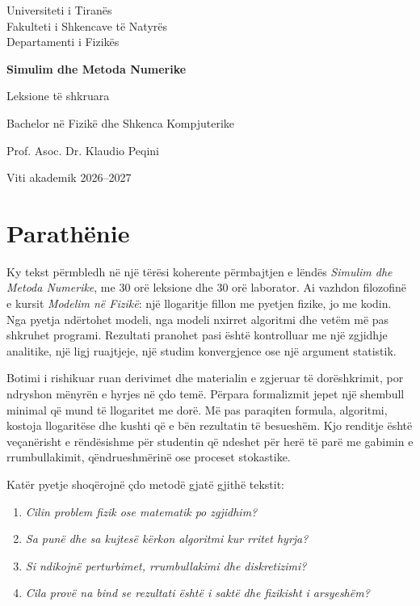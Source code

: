 \documentclass[11pt,oneside,openany]{book}
\begin{document}
\frontmatter
\begin{titlepage}
\centering
\vspace*{1.5cm}
{\Large Universiteti i Tiranës\\Fakulteti i Shkencave të Natyrës\\Departamenti i Fizikës\par}
\vspace{2.2cm}
{\Huge\bfseries Simulim dhe Metoda Numerike\par}
\vspace{.6cm}
{\LARGE Leksione të shkruara\par}
\vspace{1.4cm}
{\Large Bachelor në Fizikë dhe Shkenca Kompjuterike\par}
\vfill
{\large Prof. Asoc. Dr. Klaudio Peqini\par}
\vspace{.4cm}
{\large Viti akademik 2026--2027\par}
\end{titlepage}

\chapter*{Parathënie}
Ky tekst përmbledh në një tërësi koherente përmbajtjen e lëndës
\emph{Simulim dhe Metoda Numerike}, me 30 orë leksione dhe 30 orë laborator.
Ai vazhdon filozofinë e kursit \emph{Modelim në Fizikë}: një llogaritje
fillon me pyetjen fizike, jo me kodin. Nga pyetja ndërtohet modeli, nga modeli
nxirret algoritmi dhe vetëm më pas shkruhet programi. Rezultati pranohet pasi
është kontrolluar me një zgjidhje analitike, një ligj ruajtjeje, një studim
konvergjence ose një argument statistik.

Botimi i rishikuar ruan derivimet dhe materialin e zgjeruar të dorëshkrimit,
por ndryshon mënyrën e hyrjes në çdo temë. Përpara formalizmit jepet një
shembull minimal që mund të llogaritet me dorë. Më pas paraqiten formula,
algoritmi, kostoja llogaritëse dhe kushti që e bën rezultatin të besueshëm.
Kjo renditje është veçanërisht e rëndësishme për studentin që ndeshet për herë
të parë me gabimin e rrumbullakimit, qëndrueshmërinë ose proceset stokastike.

Katër pyetje shoqërojnë çdo metodë gjatë gjithë tekstit:
\begin{enumerate}
\item \emph{Cilin problem fizik ose matematik po zgjidhim?}
\item \emph{Sa punë dhe sa kujtesë kërkon algoritmi kur rritet hyrja?}
\item \emph{Si ndikojnë perturbimet, rrumbullakimi dhe diskretizimi?}
\item \emph{Cila provë na bind se rezultati është i saktë dhe fizikisht i arsyeshëm?}
\end{enumerate}
\end{document}
